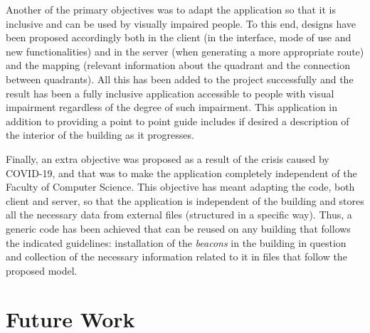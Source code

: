 Another of the primary objectives was to adapt the application so that it is inclusive and can be used by visually impaired people. To this end, designs have been proposed accordingly both in the client (in the interface, mode of use and new functionalities) and in the server (when generating a more appropriate route) and the mapping (relevant information about the quadrant and the connection between quadrants). All this has been added to the project successfully and the result has been a fully inclusive application accessible to people with visual impairment regardless of the degree of such impairment. This application in addition to providing a point to point guide includes if desired a description of the interior of the building as it progresses.

Finally, an extra objective was proposed as a result of the crisis caused by COVID-19, and that was to make the application completely independent of the Faculty of Computer Science. This objective has meant adapting the code, both client and server, so that the application is independent of the building and stores all the necessary data from external files (structured in a specific way). Thus, a generic code has been achieved that can be reused on any building that follows the indicated guidelines: installation of the \textit{beacons} in the building in question and collection of the necessary information related to it in files that follow the proposed model.

\section {Future Work}
\label{sec:trabajoFuturo_eng}

